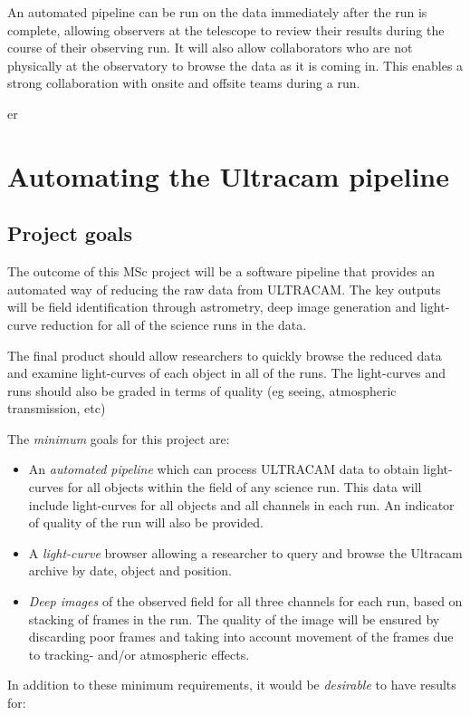 An automated pipeline can be run on the data immediately after the run is complete, allowing observers at the telescope to review their results during the course of their observing run. It will also allow collaborators who are not physically at the observatory to browse the data as it is coming in. This enables a strong collaboration with onsite and offsite teams during a run. 

er
\section{Automating the Ultracam pipeline}

\subsection{Project goals}
The outcome of this MSc project will be a software pipeline that provides an automated way of reducing the raw data from ULTRACAM.  The key outputs will be field identification through astrometry, deep image generation and light-curve reduction for all of the science runs in the data. 

The final product should allow researchers to quickly browse the reduced data and examine light-curves of each object in all of the 
runs. The light-curves and runs should also be graded in terms of quality (eg seeing, atmospheric transmission, etc) 

The \emph{minimum} goals for this project are:
\begin{itemize}
	\item An \emph{automated pipeline} which can process ULTRACAM data to obtain light-curves for all objects within the field of any science run. This data will include light-curves for all objects and all channels in each run. An indicator of quality of the run will also be provided. 
	\item A \emph{light-curve} browser allowing a researcher to query and browse the Ultracam archive by date, object and position.
	\item \emph{Deep images} of the observed field for all three channels for each run, based on stacking of frames in the run. The quality of the image will be ensured by discarding poor frames and taking into account movement of the frames due to tracking- and/or atmospheric effects. 
\end{itemize}

In addition to these minimum requirements, it would be \emph{desirable} to have results for:

